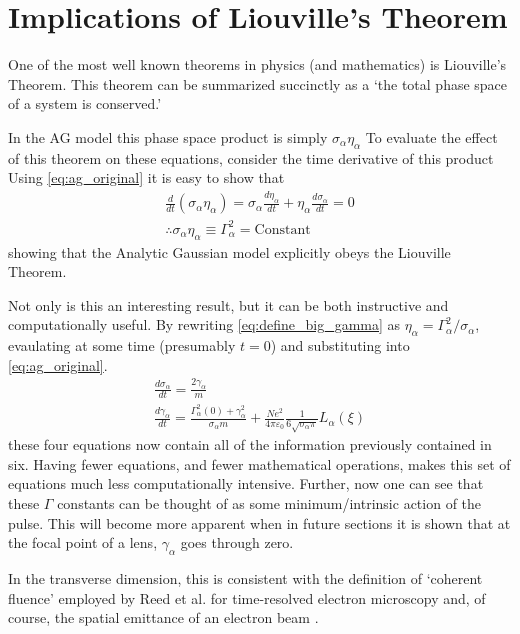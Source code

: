 
\section{Implications of Liouville's Theorem} \label{sec:liouville}

One of the most well known theorems in physics (and mathematics) is Liouville's Theorem.
This theorem can be summarized succinctly as a `the total phase space of a system is conserved.'

In the AG model this phase space product is simply $\sigma_{\alpha} \eta_{\alpha}$
To evaluate the effect of this theorem on these equations, consider the time derivative of this product
Using \ref{eq:ag_original} it is easy to show that
\begin{gather}
  \frac{d}{dt} (\sigma_{\alpha} \eta_{\alpha}) = \sigma_{\alpha} \frac{d \eta_{\alpha}}{dt} + \eta_{\alpha} \frac{d \sigma_{\alpha}}{dt} = 0\\
  \label{eq:define_big_gamma}
  \therefore \sigma_{\alpha} \eta_{\alpha} \equiv \Gamma_{\alpha}^2 = \text{Constant}
\end{gather}
showing that the Analytic Gaussian model explicitly obeys the Liouville Theorem.

Not only is this an interesting result, but it can be both instructive and computationally useful.
By rewriting \ref{eq:define_big_gamma} as $\eta_{\alpha} = \Gamma_{\alpha}^2 / \sigma_{\alpha}$, evaulating at some time (presumably $t=0$) and substituting into \ref{eq:ag_original}.
\begin{subequations} \label{eq:ag_big_gamma}
\begin{gather}
  \frac{d\sigma_{\alpha}}{dt} = \frac{2\gamma_{\alpha}}{m} \\
  \frac{d\gamma_{\alpha}}{dt} = \frac{ \Gamma_{\alpha}^2(0) + \gamma_{\alpha}^2 }{\sigma_{\alpha} m}
    + \frac{N e^2}{4\pi\varepsilon_0} \frac{1}{6 \sqrt{\sigma_{\alpha}\pi}} L_{\alpha}(\xi) \label{eq:ag_big_gamma_gamma}
\end{gather}
\end{subequations}
these four equations now contain all of the information previously contained in six.
Having fewer equations, and fewer mathematical operations, makes this set of equations much less computationally intensive.
Further, now one can see that these $\Gamma$ constants can be thought of as some minimum/intrinsic action of the pulse. 
This will become more apparent when in future sections
it is shown that at the focal point of a lens, $\gamma_{\alpha}$ goes through zero.

In the transverse dimension, this is consistent with the definition of `coherent fluence' employed by Reed et al.\cite{reed_evolution_2009} for time-resolved electron microscopy and, of course, the spatial emittance of an electron beam \cite{jensen_theoretical_2006,siwick_ultrafast_2002}.
